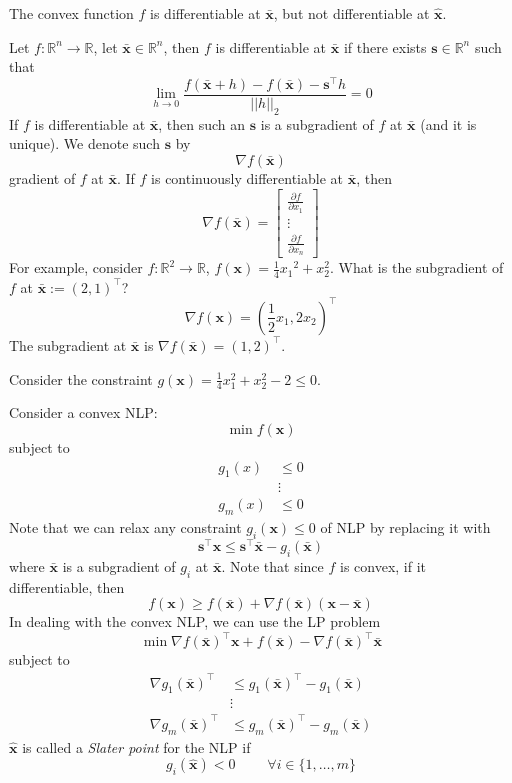 The convex function $ f $ is differentiable at $ \bm{\bar{x}} $, but not
differentiable at $ \bm{\hat{x}} $.

Let $ f:\mathbb{R}^n\to\mathbb{R} $, let $ \bm{\bar{x}}\in\mathbb{R}^n $,
then $ f $ is differentiable at $ \bm{\bar{x}} $
if there exists $ \bm{s}\in \mathbb{R}^{n} $ such that
\[ \lim\limits_{{h} \to {0}} \frac{f(\bm{\bar{x}}+h)-f(\bm{\bar{x}})-\bm{s}^\top h}{||h||_{2}}=0 \]
If $ f $ is differentiable at $ \bm{\bar{x}} $, then such an $ \bm{s} $ is a subgradient
of $ f $ at $ \bm{\bar{x}} $ (and it is unique). We denote such $ \bm{s} $ by
\[ \nabla f(\bm{\bar{x}}) \]
gradient of $ f $ at $ \bm{\bar{x}} $. If $ f $ is continuously differentiable
at $ \bm{\bar{x}} $, then
\[ \nabla f(\bm{\bar{x}})=
\begin{bmatrix}
    \frac{\partial f}{\partial x_1}\\
    \vdots\\
    \frac{\partial f}{\partial x_n} 
\end{bmatrix} \]
For example, consider $ f:\mathbb{R}^{2} \to \mathbb{R} $, $ f(\bm{x})=\frac{1}{4} {x_1}^2+x_2^2 $.
What is the subgradient of $ f $ at $ \bm{\bar{x}}:=(2,1)^\top $?
\[ \nabla f(\bm{x})=(\frac{1}{2} x_1, 2x_2)^\top \]
The subgradient at $ \bm{\bar{x}} $ is $ \nabla f(\bm{\bar{x}})=(1,2)^\top $.

Consider the constraint $ g(\bm{x})=\frac{1}{4} x_1^2+x_2^2-2\leqslant 0 $.

Consider a convex NLP:
\[ \min f(\bm{x}) \]
subject to
\begin{align*}
    g_1(x)&\leqslant 0\\
    &\vdots\\
    g_m(x)&\leqslant 0
\end{align*}
Note that we can relax any constraint $ g_i(\bm{x})\leqslant 0 $ of NLP by replacing it with
\[ \bm{s}^\top \bm{x}\leqslant \bm{s}^\top \bm{\bar{x}}-g_i(\bm{\bar{x}}) \]
where $ \bm{\bar{x}} $ is a subgradient of $ g_i $ at $ \bm{\bar{x}} $.
Note that since $ f $ is convex, if it differentiable, then
\[ f(\bm{x})\geqslant f(\bm{\bar{x}})+\nabla f(\bm{\bar{x}})(\bm{x}-\bm{\bar{x}}) \]
In dealing with the convex NLP, we can use the LP problem
\[ \min \nabla f(\bm{\bar{x}})^\top \bm{x}+f(\bm{\bar{x}})-\nabla f(\bm{\bar{x}})^\top \bm{\bar{x}} \]
subject to
\begin{align*}
    \nabla g_1(\bm{\bar{x}})^\top&\leqslant g_1(\bm{\bar{x}})^\top -g_1(\bm{\bar{x}})\\
    &\vdots\\
    \nabla g_m(\bm{\bar{x}})^\top&\leqslant g_m(\bm{\bar{x}})^\top -g_m(\bm{\bar{x}})
\end{align*}
$ \bm{\hat{x}} $ is called a \emph{Slater point} for the NLP if
\[ g_i(\bm{\hat{x}})<0\; \qquad \forall i\in \{1,\ldots ,m\} \]

